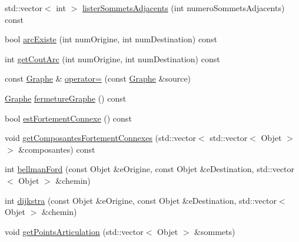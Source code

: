 \begin{DoxyCompactItemize}
\item 
std::vector$<$ int $>$ \hyperlink{class_graphe_a73fe579de3baea2990bbefb2b0daf0c9}{listerSommetsAdjacents} (int numeroSommetsAdjacents) const 
\item 
bool \hyperlink{class_graphe_a866fbd9e68914829c900b2f3a2ef3565}{arcExiste} (int numOrigine, int numDestination) const 
\item 
int \hyperlink{class_graphe_a5178a5335a20e3a549af0b69c9c83782}{getCoutArc} (int numOrigine, int numDestination) const 
\item 
const \hyperlink{class_graphe}{Graphe} \& \hyperlink{class_graphe_aff62a5ca152f992f32671db122d47455}{operator=} (const \hyperlink{class_graphe}{Graphe} \&source)
\item 
\hyperlink{class_graphe}{Graphe} \hyperlink{class_graphe_aa6fafc310fd5a096f75d018c7404f9ed}{fermetureGraphe} () const 
\item 
bool \hyperlink{class_graphe_abdc4f27fc9498cc3814d03a97c87b7e7}{estFortementConnexe} () const 
\item 
void \hyperlink{class_graphe_ad63af90bd6395092dfe311a36f15833c}{getComposantesFortementConnexes} (std::vector$<$ std::vector$<$ Objet $>$ $>$ \&composantes) const 
\item 
int \hyperlink{class_graphe_a077802b65dad92e0d7e593abbca17478}{bellmanFord} (const Objet \&eOrigine, const Objet \&eDestination, std::vector$<$ Objet $>$ \&chemin)
\item 
int \hyperlink{class_graphe_a46ea944cd82af0d14b67ed66ac57261f}{dijkstra} (const Objet \&eOrigine, const Objet \&eDestination, std::vector$<$ Objet $>$ \&chemin)
\item 
void \hyperlink{class_graphe_acf31ba4346b58850d69ba22ee75bdf48}{getPointsArticulation} (std::vector$<$ Objet $>$ \&sommets)
\end{DoxyCompactItemize}

